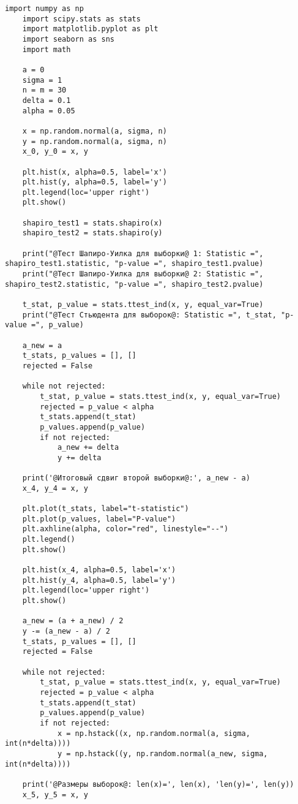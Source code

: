 \begin{lstlisting}[label=lst:1,caption=Проверка статистических гипотез для двух выборок]
	import numpy as np
	import scipy.stats as stats
	import matplotlib.pyplot as plt
	import seaborn as sns
	import math
	
	a = 0
	sigma = 1
	n = m = 30
	delta = 0.1
	alpha = 0.05
	
	x = np.random.normal(a, sigma, n)
	y = np.random.normal(a, sigma, n)
	x_0, y_0 = x, y
	
	plt.hist(x, alpha=0.5, label='x')
	plt.hist(y, alpha=0.5, label='y')
	plt.legend(loc='upper right')
	plt.show()
	
	shapiro_test1 = stats.shapiro(x)
	shapiro_test2 = stats.shapiro(y)
	
	print("@Тест Шапиро-Уилка для выборки@ 1: Statistic =", shapiro_test1.statistic, "p-value =", shapiro_test1.pvalue)
	print("@Тест Шапиро-Уилка для выборки@ 2: Statistic =", shapiro_test2.statistic, "p-value =", shapiro_test2.pvalue)
	
	t_stat, p_value = stats.ttest_ind(x, y, equal_var=True)
	print("@Тест Стьюдента для выборок@: Statistic =", t_stat, "p-value =", p_value)
	
	a_new = a
	t_stats, p_values = [], []
	rejected = False
	
	while not rejected:
		t_stat, p_value = stats.ttest_ind(x, y, equal_var=True)
		rejected = p_value < alpha
		t_stats.append(t_stat)
		p_values.append(p_value)
		if not rejected:
			a_new += delta
			y += delta
	
	print('@Итоговый сдвиг второй выборки@:', a_new - a)
	x_4, y_4 = x, y
	
	plt.plot(t_stats, label="t-statistic")
	plt.plot(p_values, label="P-value")
	plt.axhline(alpha, color="red", linestyle="--")
	plt.legend()
	plt.show()
	
	plt.hist(x_4, alpha=0.5, label='x')
	plt.hist(y_4, alpha=0.5, label='y')
	plt.legend(loc='upper right')
	plt.show()
	
	a_new = (a + a_new) / 2
	y -= (a_new - a) / 2
	t_stats, p_values = [], []
	rejected = False
	
	while not rejected:
		t_stat, p_value = stats.ttest_ind(x, y, equal_var=True)
		rejected = p_value < alpha
		t_stats.append(t_stat)
		p_values.append(p_value)
		if not rejected:
			x = np.hstack((x, np.random.normal(a, sigma, int(n*delta))))
			y = np.hstack((y, np.random.normal(a_new, sigma, int(n*delta))))
	
	print('@Размеры выборок@: len(x)=', len(x), 'len(y)=', len(y))
	x_5, y_5 = x, y
	

\end{lstlisting}
